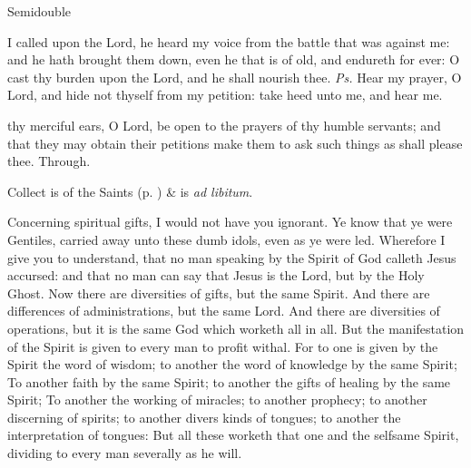 \begin{inhead}
{Semidouble}
\end{inhead}
\par\noindent
{}





\properantiphonfix

\introit
{} I called upon the Lord, he heard my voice from the battle that was against me: and he hath brought them down, even he that is of old, and endureth for ever: O cast thy burden upon the Lord, and he shall nourish thee. \textit{Ps.} Hear my prayer, O Lord, and hide not thyself from my petition: take heed unto me, and hear me.

\collect
{} thy merciful ears, O Lord, be open to the prayers of thy humble servants; and that they may obtain their petitions make them to ask such things as shall please thee. Through.
\begin{rubric}
     Collect is of the Saints (p. \pageref{SPSaints}) \&  is \emph{ad libitum}.
\end{rubric}

 Concerning spiritual gifts, I would not have you ignorant. Ye know that ye were Gentiles, carried away unto these dumb idols, even as ye were led. Wherefore I give you to understand, that no man speaking by the Spirit of God calleth Jesus accursed: and that no man can say that Jesus is the Lord, but by the Holy Ghost. Now there are diversities of gifts, but the same Spirit. And there are differences of administrations, but the same Lord. And there are diversities of operations, but it is the same God which worketh all in all. But the manifestation of the Spirit is given to every man to profit withal. For to one is given by the Spirit the word of wisdom; to another the word of knowledge by the same Spirit; To another faith by the same Spirit; to another the gifts of healing by the same Spirit; To another the working of miracles; to another prophecy; to another discerning of spirits; to another divers kinds of tongues; to another the interpretation of tongues: But all these worketh that one and the selfsame Spirit, dividing to every man severally as he will.

